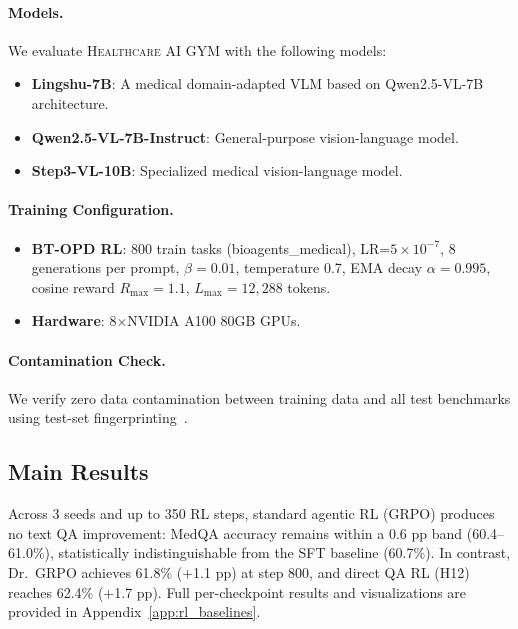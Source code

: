 \documentclass{article}
\newcommand{\gym}{\textsc{Healthcare AI GYM}}
\begin{document}
\paragraph{Models.} We evaluate \gym{} with the following models:
\begin{itemize}
    \item \textbf{Lingshu-7B}: A medical domain-adapted VLM based on Qwen2.5-VL-7B architecture.
    \item \textbf{Qwen2.5-VL-7B-Instruct}: General-purpose vision-language model.
    \item \textbf{Step3-VL-10B}: Specialized medical vision-language model.
\end{itemize}

\paragraph{Training Configuration.}
\begin{itemize}
    \item \textbf{BT-OPD RL}: 800 train tasks (bioagents\_medical), LR=$5 \times 10^{-7}$, 8 generations per prompt, $\beta{=}0.01$, temperature 0.7, EMA decay $\alpha{=}0.995$, cosine reward $R_{\text{max}}{=}1.1$, $L_{\text{max}}{=}12{,}288$ tokens.
    \item \textbf{Hardware}: 8$\times$NVIDIA A100 80GB GPUs.
\end{itemize}

\paragraph{Contamination Check.} We verify zero data contamination between training data and all test benchmarks using test-set fingerprinting~\citep{yang2023rethinking}.


\subsection{Main Results}
\label{sec:results}

Across 3 seeds and up to 350 RL steps, standard agentic RL (GRPO) produces no text QA improvement: MedQA accuracy remains within a 0.6 pp band (60.4--61.0\%), statistically indistinguishable from the SFT baseline (60.7\%). In contrast, Dr.~GRPO achieves 61.8\% (+1.1 pp) at step 800, and direct QA RL (H12) reaches 62.4\% (+1.7 pp). Full per-checkpoint results and visualizations are provided in Appendix~\ref{app:rl_baselines}.
\end{document}
